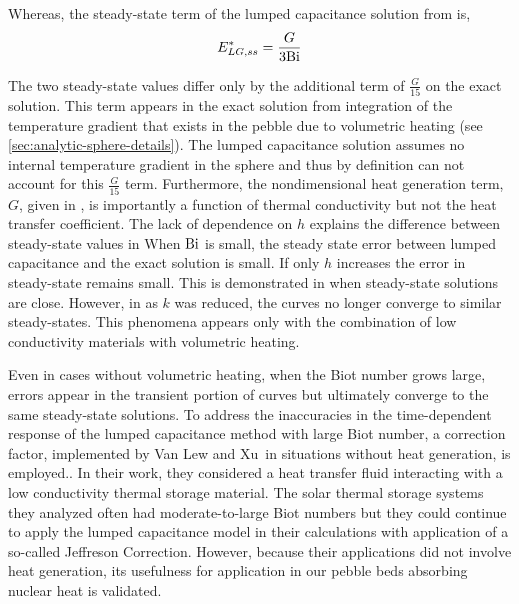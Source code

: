 Whereas, the steady-state term of the lumped capacitance solution from  is,
\begin{equation}
	E^*_{LG,ss} = \frac{G}{3\mathrm{Bi}}
\end{equation}

The two steady-state values differ only by the additional term of $\frac{G}{15}$ on the exact solution. This term appears in the exact solution from integration of the temperature gradient that exists in the pebble due to volumetric heating (see \cref{sec:analytic-sphere-details}). The lumped capacitance solution assumes no internal temperature gradient in the sphere and thus by definition can not account for this $\frac{G}{15}$ term. Furthermore, the nondimensional heat generation term, $G$, given in , is importantly a function of thermal conductivity but not the heat transfer coefficient. The lack of dependence on $h$ explains the difference between steady-state values in   When $\mathrm{Bi}$ is small, the steady state error between lumped capacitance and the exact solution is small. If only $h$ increases the error in steady-state remains small. This is demonstrated in  when steady-state solutions are close. However, in  as $k$ was reduced, the curves no longer converge to similar steady-states. This phenomena appears only with the combination of low conductivity materials with volumetric heating.

Even in cases without volumetric heating, when the Biot number grows large, errors appear in the transient portion of curves but ultimately converge to the same steady-state solutions. To address the inaccuracies in the time-dependent response of the lumped capacitance method with large Biot number, a correction factor, implemented by Van Lew and Xu\etal~in situations without heat generation, is employed.\cite{VanLew2010,Xu2012}. In their work, they considered a heat transfer fluid interacting with a low conductivity thermal storage material. The solar thermal storage systems they analyzed often had moderate-to-large Biot numbers but they could continue to apply the lumped capacitance model in their calculations with application of a so-called Jeffreson Correction.\cite{jeffreson409} However, because their applications did not involve heat generation, its usefulness for application in our pebble beds absorbing nuclear heat is validated.





